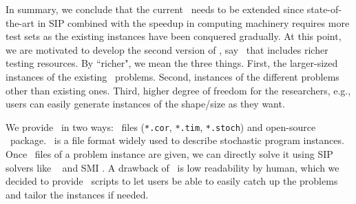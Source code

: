 In summary, we conclude that the current \siplib\ needs to be extended since state-of-the-art in SIP combined with the speedup in computing machinery requires more test sets as the existing instances have been conquered gradually. At this point, we are motivated to develop the second version of \siplib, say \siplibtwo\ that includes richer testing resources. By ``richer", we mean the three things. First, the larger-sized instances of the existing \siplib\ problems. Second, instances of the different problems other than existing ones. Third, higher degree of freedom for the researchers, e.g., users can easily generate instances of the shape/size as they want.

We provide \siplibtwo\ in two ways: \smps\ files (\texttt{*.cor}, \texttt{*.tim}, \texttt{*.stoch}) and open-source \julia\ package. \smps\ is a file format widely used to describe stochastic program instances. Once \smps\ files of a problem instance are given, we can directly solve it using SIP solvers like \dsp\ \cite{journal:KZ2015} and \textsf{SMI} \cite{web:SMI}. A drawback of \smps\ is low readability by human, which we decided to provide \julia\ scripts to let users be able to easily catch up the problems and tailor the instances if needed.

